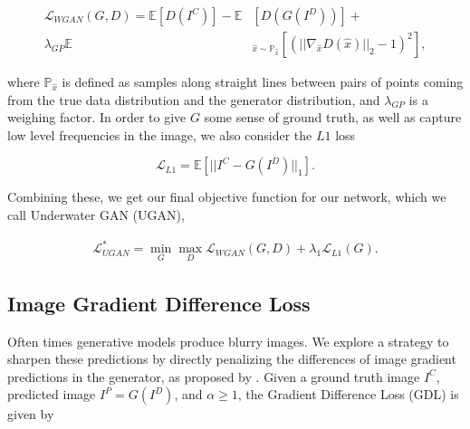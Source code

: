 \begin{equation}
\begin{aligned}
   \mathcal{L}_{WGAN}(G,D) = \mathbb{E} [D(I^C)] - \mathbb{E} & [D(G(I^D))] + \\
   \lambda_{GP} \mathbb{E} & _{\hat{x} \sim \mathbb{P}_{\hat{x}}} [(|| \nabla_{\hat{x}} D(\hat{x})||_2 -1)^2 ],
\end{aligned}
\end{equation}


\noindent where $\mathbb{P}_{\hat{x}}$ is defined as samples along straight lines between pairs of points coming from
the true data distribution and the generator distribution, and $\lambda_{GP}$ is a weighing factor. In order to give $G$
some sense of ground truth, as well as capture low level frequencies in the image, we also consider the $L1$ loss

\begin{equation}
   \mathcal{L}_{L1} = \mathbb{E} [ || I^C - G(I^D) ||_1 ].
\end{equation}

\noindent Combining these, we get our final objective function for our network, which we call Underwater GAN (UGAN),

\begin{equation}
   \begin{aligned}
      \mathcal{L}_{UGAN}^* = \min\limits_{G}\max\limits_{D} \mathcal{L}_{WGAN}(G,D) + \lambda_{1} \mathcal{L}_{L1}(G).
   \end{aligned}
\end{equation}


\subsection{Image Gradient Difference Loss}
Often times generative models produce blurry images. We explore a strategy to sharpen these predictions by
directly penalizing the differences of image gradient predictions in the generator, as proposed by
\cite{mathieu2015deep}. Given a ground truth image $I^C$, predicted image $I^P = G(I^D)$, and $\alpha \geq 1$, the
Gradient Difference Loss (GDL) is given by

